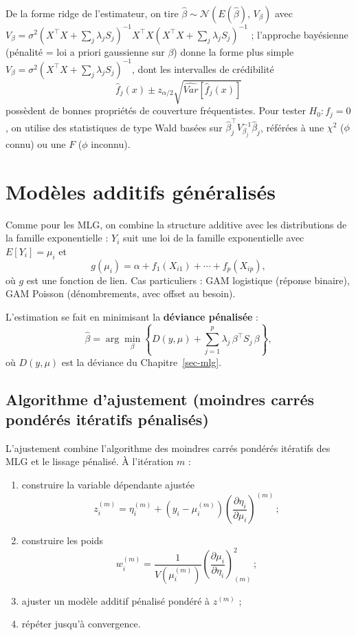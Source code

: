 \documentclass[
  french,
  letterpaper,
  DIV=11,
  numbers=noendperiod]{scrreprt}
\begin{document}
De la forme ridge de l'estimateur, on tire
\(\hat\beta\sim\mathcal{N}(E(\hat\beta),\, V_\beta)\) avec
\(V_\beta = \sigma^2(X^\top X + \sum_j\lambda_j S_j)^{-1}X^\top X(X^\top X + \sum_j\lambda_j S_j)^{-1}\)
; l'approche bayésienne (pénalité = loi a priori gaussienne sur
\(\beta\)) donne la forme plus simple
\(V_\beta = \sigma^2(X^\top X + \sum_j\lambda_j S_j)^{-1}\), dont les
intervalles de crédibilité
\[\hat f_j(x) \pm z_{\alpha/2}\sqrt{\widehat{Var}[\hat f_j(x)]}\]
possèdent de bonnes propriétés de couverture fréquentistes. Pour tester
\(H_0: f_j = 0\), on utilise des statistiques de type Wald basées sur
\(\hat\beta_j^\top V_{\beta_j}^{-1}\hat\beta_j\), référées à une
\(\chi^2\) (\(\phi\) connu) ou une \(F\) (\(\phi\) inconnu).

\section{Modèles additifs
généralisés}\label{moduxe8les-additifs-guxe9nuxe9ralisuxe9s}

Comme pour les MLG, on combine la structure additive avec les
distributions de la famille exponentielle : \(Y_i\) suit une loi de la
famille exponentielle avec \(E[Y_i] = \mu_i\) et
\[g(\mu_i) = \alpha + f_1(X_{i1}) + \cdots + f_p(X_{ip}),\] où \(g\) est
une fonction de lien. Cas particuliers : GAM logistique (réponse
binaire), GAM Poisson (dénombrements, avec offset au besoin).

L'estimation se fait en minimisant la \textbf{déviance pénalisée} :
\[\hat\beta = \arg\min_\beta\left\{D(y,\mu) + \sum_{j=1}^p\lambda_j\,\beta^\top S_j\,\beta\right\},\]
où \(D(y,\mu)\) est la déviance du Chapitre~\ref{sec-mlg}.

\subsection{Algorithme d'ajustement (moindres carrés pondérés itératifs
pénalisés)}\label{algorithme-dajustement-moindres-carruxe9s-ponduxe9ruxe9s-ituxe9ratifs-puxe9nalisuxe9s}

L'ajustement combine l'algorithme des moindres carrés pondérés itératifs
des MLG et le lissage pénalisé. À l'itération \(m\) :

\begin{enumerate}
\def\labelenumi{\arabic{enumi}.}
\item
  construire la variable dépendante ajustée
  \[z_i^{(m)} = \eta_i^{(m)} + (y_i - \mu_i^{(m)})\left(\frac{\partial\eta_i}{\partial\mu_i}\right)^{(m)}\,;\]
\item
  construire les poids
  \[w_i^{(m)} = \frac{1}{V(\mu_i^{(m)})}\left(\frac{\partial\mu_i}{\partial\eta_i}\right)^2_{(m)}\,;\]
\item
  ajuster un modèle additif pénalisé pondéré à \(z^{(m)}\) ;
\item
  répéter jusqu'à convergence.
\end{enumerate}
\end{document}
